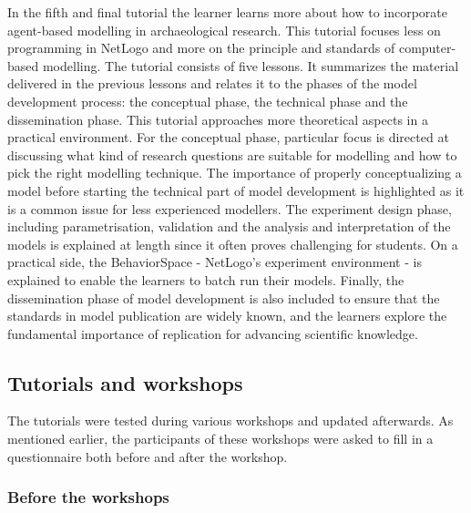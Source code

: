 \documentclass[
]{article}
\begin{document}
In the fifth and final tutorial the learner learns more about how to incorporate agent-based modelling in archaeological research. This tutorial focuses less on programming in NetLogo and more on the principle and standards of computer-based modelling. The tutorial consists of five lessons. It summarizes the material delivered in the previous lessons and relates it to the phases of the model development process: the conceptual phase, the technical phase and the dissemination phase. This tutorial approaches more theoretical aspects in a practical environment. For the conceptual phase, particular focus is directed at discussing what kind of research questions are suitable for modelling and how to pick the right modelling technique. The importance of properly conceptualizing a model before starting the technical part of model development is highlighted as it is a common issue for less experienced modellers. The experiment design phase, including parametrisation, validation and the analysis and interpretation of the models is explained at length since it often proves challenging for students. On a practical side, the BehaviorSpace - NetLogo's experiment environment - is explained to enable the learners to batch run their models. Finally, the dissemination phase of model development is also included to ensure that the standards in model publication are widely known, and the learners explore the fundamental importance of replication for advancing scientific knowledge.

\hypertarget{tutorials-and-workshops}{%
\subsection{Tutorials and workshops}\label{tutorials-and-workshops}}

The tutorials were tested during various workshops and updated afterwards. As mentioned earlier, the participants of these workshops were asked to fill in a questionnaire both before and after the workshop.

\hypertarget{before-the-workshops}{%
\subsubsection{Before the workshops}\label{before-the-workshops}}
\end{document}
